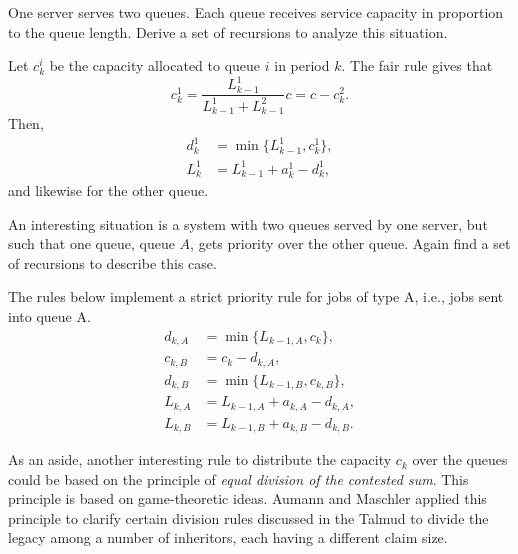 \begin{extra} 
 One server serves two queues.
 Each queue receives service capacity in proportion to the queue length.
 Derive a set of recursions to analyze this situation.
\begin{solution}
 Let $c_k^i$ be the capacity allocated to queue $i$ in period $k$. The fair rule gives that 
 \begin{equation*}
 c_k^1 = \frac{L_{k-1}^1}{L_{k-1}^1 + L_{k-1}^2} c = c - c_k^2. 
 \end{equation*}
Then, 
\begin{equation*}
 \begin{split}
 d_k^1 &= \min\{L_{k-1}^1, c^1_k\}, \\
L_k^1 &= L_{k-1}^1+a_k^1 - d_k^1,
 \end{split}
\end{equation*}
and likewise for the other queue.
\end{solution}
\end{extra}

\begin{exercise}
 An interesting situation is a system with two queues served by one server, but such that one queue, queue $A$, gets priority over the other queue.
 Again find a set of recursions to describe this case.
\begin{solution}
 The rules below implement a strict priority rule for jobs of type
 A, i.e., jobs sent into queue A.
\begin{equation*}
 \begin{split}
 d_{k,A} &= \min\{L_{k-1, A}, c_k\}, \\
 c_{k,B} &= c_k - d_{k,A}, \\
 d_{k,B} &= \min\{L_{k-1, B}, c_{k,B}\}, \\
 L_{k,A} &= L_{k-1, A} + a_{k,A} - d_{k,A}, \\
 L_{k,B} &= L_{k-1, B} + a_{k,B} - d_{k,B}.
 \end{split}
\end{equation*}

As an aside, another interesting rule to distribute the capacity $c_k$ over the queues could be based on the principle of \textit{ equal division of the contested sum}.
This principle is based on game-theoretic ideas.
Aumann and Maschler applied this principle to clarify certain division rules discussed in the Talmud to divide the legacy among a number of inheritors, each having a different claim size.
\end{solution}
\end{exercise}



